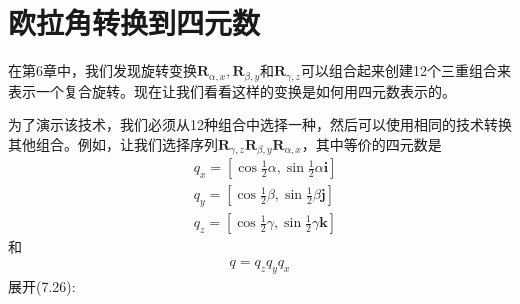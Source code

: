 

\section{欧拉角转换到四元数}
在第6章中，我们发现旋转变换$\mathbf{R}_{\alpha, x}, \mathbf{R}_{\beta, y}$和$\mathbf{R}_{\gamma, z}$可以组合起来创建12个三重组合来表示一个复合旋转。现在让我们看看这样的变换是如何用四元数表示的。

为了演示该技术，我们必须从12种组合中选择一种，然后可以使用相同的技术转换其他组合。例如，让我们选择序列$\mathbf{R}_{\gamma, z} \mathbf{R}_{\beta, y} \mathbf{R}_{\alpha, x}$，其中等价的四元数是
$$
\begin{aligned}
& q_{x}=\left[\cos \frac{1}{2} \alpha, \sin \frac{1}{2} \alpha \mathbf{i}\right] \\
& q_{y}=\left[\cos \frac{1}{2} \beta, \sin \frac{1}{2} \beta \mathbf{j}\right] \\
& q_{z}=\left[\cos \frac{1}{2} \gamma, \sin \frac{1}{2} \gamma \mathbf{k}\right]
\end{aligned}
$$
和
\begin{align}
    q=q_{z} q_{y} q_{x}
\end{align}
展开(7.26):
